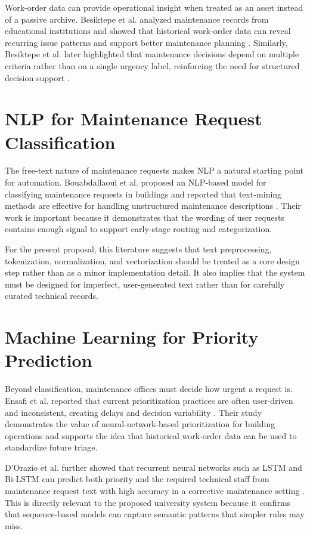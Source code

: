 \documentclass[11pt,a4paper]{report}
\begin{document}
Work-order data can provide operational insight when treated as an asset instead of a passive archive. Besiktepe et al. analyzed maintenance records from educational institutions and showed that historical work-order data can reveal recurring issue patterns and support better maintenance planning \cite{besiktepe2019}. Similarly, Besiktepe et al. later highlighted that maintenance decisions depend on multiple criteria rather than on a single urgency label, reinforcing the need for structured decision support \cite{besiktepe2020}.

\section{NLP for Maintenance Request Classification}
The free-text nature of maintenance requests makes \ac{NLP} a natural starting point for automation. Bouabdallaoui et al. proposed an \ac{NLP}-based model for classifying maintenance requests in buildings and reported that text-mining methods are effective for handling unstructured maintenance descriptions \cite{bouabdallaoui2020}. Their work is important because it demonstrates that the wording of user requests contains enough signal to support early-stage routing and categorization.

For the present proposal, this literature suggests that text preprocessing, tokenization, normalization, and vectorization should be treated as a core design step rather than as a minor implementation detail. It also implies that the system must be designed for imperfect, user-generated text rather than for carefully curated technical records.

\section{Machine Learning for Priority Prediction}
Beyond classification, maintenance offices must decide how urgent a request is. Ensafi et al. reported that current prioritization practices are often user-driven and inconsistent, creating delays and decision variability \cite{ensafi2024}. Their study demonstrates the value of neural-network-based prioritization for building operations and supports the idea that historical work-order data can be used to standardize future triage.

D'Orazio et al. further showed that recurrent neural networks such as \ac{LSTM} and Bi-LSTM can predict both priority and the required technical staff from maintenance request text with high accuracy in a corrective maintenance setting \cite{dorazio2023}. This is directly relevant to the proposed university system because it confirms that sequence-based models can capture semantic patterns that simpler rules may miss.
\end{document}
